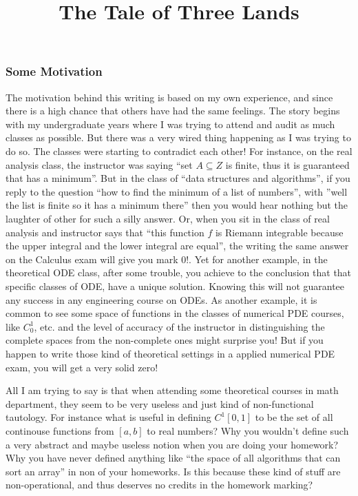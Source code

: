 \documentclass[10pt,a4paper]{article}
\title{\fontfamily{pzc}\selectfont The Tale of Three Lands}
\begin{document}
\maketitle

\subsubsection*{Some Motivation}
	
The motivation behind this writing is based on my own experience, and since there is a high chance that others have had the same feelings. The story begins with my undergraduate years where I was trying to attend and audit as much classes as possible.  But there was a very wired thing happening as I was trying to do so. The classes were starting to contradict each other! For instance, on the real analysis class, the instructor was saying ``set $A \subseteq Z$ is finite, thus it is guaranteed that has a minimum''. But in the class of ``data structures and algorithms'', if you reply to the question ``how to find the minimum of a list of numbers'', with ''well the list is finite so it has a minimum there'' then you would hear nothing but the laughter of other for such a silly answer. Or, when you sit in the class of real analysis and instructor says that ``this function $f$ is Riemann integrable because the upper integral and the lower integral are equal'', the writing the same answer on the Calculus exam will give you mark 0!. Yet for another example, in the theoretical ODE class, after some trouble, you achieve to the conclusion that that specific classes of ODE, have a unique solution. Knowing this will not guarantee any success in any engineering course on ODEs. As another example, it is common to see some space of functions in the classes of numerical PDE courses, like $C_0^1$, etc. and the level of accuracy of the instructor in distinguishing the complete spaces from the non-complete ones might surprise you! But if you happen to write those kind of theoretical settings in a applied numerical PDE exam, you will get a very solid zero!

\medskip

All I am trying to say is that when attending some theoretical courses in math department, they seem to be very useless and just kind of non-functional tautology. For instance what is useful in defining $C^1[0,1]$ to be the set of all continouse functions from $[a,b]$ to real numbers? Why you wouldn't define such a very abstract and maybe useless notion when you are doing your homework? Why you have never defined anything like ``the space of all algorithms that can sort an array'' in non of your homeworks. Is this because these kind of stuff are non-operational, and thus deserves no credits in the homework marking?
	
\end{document}
